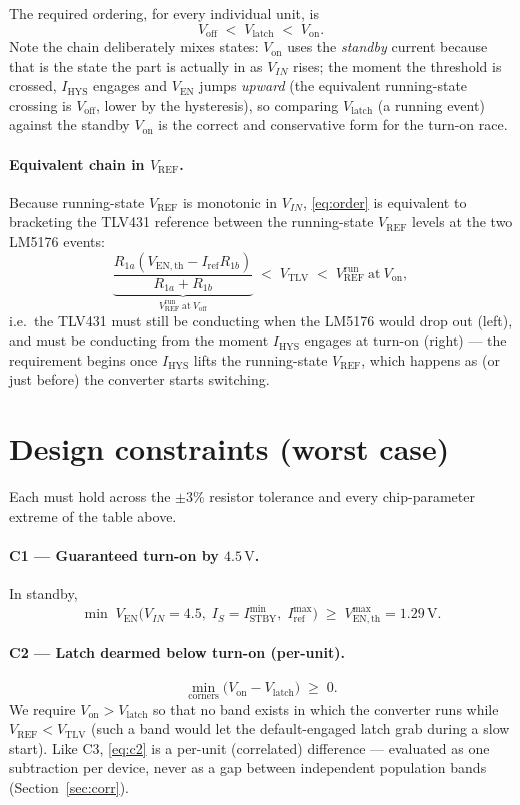 \documentclass[11pt]{article}
\newcommand{\volt}{\mathrm{V}}\newcommand{\ampere}{\mathrm{A}}
\newcommand{\SI}[2]{\ensuremath{#1\,#2}}
\newcommand{\Ven}{V_{\mathrm{EN}}}
\newcommand{\Vref}{V_{\mathrm{REF}}}
\newcommand{\Vtlv}{V_{\mathrm{TLV}}}
\newcommand{\Vth}{V_{\mathrm{EN,th}}}
\newcommand{\Iref}{I_{\mathrm{ref}}}
\newcommand{\Istby}{I_{\mathrm{STBY}}}
\newcommand{\Ihys}{I_{\mathrm{HYS}}}
\newcommand{\Rone}{R_{1a}}
\newcommand{\Rtwo}{R_{1b}}
\newcommand{\Von}{V_{\mathrm{on}}}
\newcommand{\Voff}{V_{\mathrm{off}}}
\newcommand{\Vlatch}{V_{\mathrm{latch}}}
\begin{document}
The required ordering, for every individual unit, is
\begin{equation}
\Voff\;<\;\Vlatch\;<\;\Von .
\label{eq:order}
\end{equation}
Note the chain deliberately mixes states: $\Von$ uses the \emph{standby}
current because that is the state the part is actually in as $V_{IN}$ rises;
the moment the threshold is crossed, $\Ihys$ engages and $\Ven$ jumps
\emph{upward} (the equivalent running-state crossing is $\Voff$, lower by the
hysteresis), so comparing $\Vlatch$ (a running event) against the standby
$\Von$ is the correct and conservative form for the turn-on race.

\paragraph{Equivalent chain in $\Vref$.} Because running-state $\Vref$ is
monotonic in $V_{IN}$, \eqref{eq:order} is equivalent to bracketing the TLV431
reference between the running-state $\Vref$ levels at the two LM5176 events:
\begin{equation}
\underbrace{\frac{\Rone(\Vth-\Iref\Rtwo)}{\Rone+\Rtwo}}_{\Vref^{\mathrm{run}}\ \text{at}\ \Voff}
\;<\;\Vtlv\;<\;\Vref^{\mathrm{run}}\ \text{at}\ \Von ,
\label{eq:order_ref}
\end{equation}
i.e.\ the TLV431 must still be conducting when the LM5176 would drop out
(left), and must be conducting from the moment $\Ihys$ engages at turn-on
(right) --- the requirement begins once $\Ihys$ lifts the running-state
$\Vref$, which happens as (or just before) the converter starts switching.

\section{Design constraints (worst case)}

Each must hold across the $\pm3\%$ resistor tolerance and every chip-parameter
extreme of the table above.

\paragraph{C1 --- Guaranteed turn-on by \SI{4.5}{\volt}.}
In standby,
\begin{equation}
\min \;\Ven\big(V_{IN}{=}4.5,\;I_S{=}\Istby^{\min},\;\Iref^{\max}\big)\;\ge\;\Vth^{\max}=\SI{1.29}{\volt}.
\end{equation}

\paragraph{C2 --- Latch dearmed below turn-on (per-unit).}
\begin{equation}
\min_{\text{corners}}\big(\Von-\Vlatch\big)\;\ge\;0 .
\label{eq:c2}
\end{equation}
We require $\Von>\Vlatch$ so that no band exists in which the converter runs
while $\Vref<\Vtlv$ (such a band would let the default-engaged latch grab
during a slow start). Like C3, \eqref{eq:c2} is a per-unit
(correlated) difference --- evaluated as one subtraction per device, never as a
gap between independent population bands (Section~\ref{sec:corr}).
\end{document}
